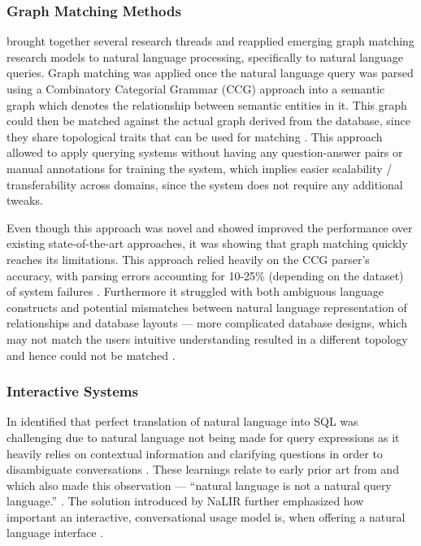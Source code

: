 \documentclass{article}
\begin{document}
\subsubsection{Graph Matching Methods}

\cite{GraphMatching} brought together several research threads and reapplied emerging graph matching research models
to natural language processing, specifically to natural language queries. Graph matching was applied once the natural 
language query was parsed using a Combinatory Categorial Grammar (CCG) approach into a semantic graph which denotes the 
relationship between semantic entities in it. This graph could then be matched against the actual graph derived from 
the database, since they share topological traits that can be used for matching \citep{GraphMatching}. This approach 
allowed to apply querying systems without having any question-answer pairs or manual annotations for training the system, 
which implies easier scalability / transferability across domains, since the system does not require any additional 
tweaks.

Even though this approach was novel and showed improved the performance over existing state-of-the-art approaches, it
was showing that graph matching quickly reaches its limitations. This approach relied heavily on the CCG parser's 
accuracy, with parsing errors accounting for 10-25\% (depending on the dataset) of system failures \citep{GraphMatching}. 
Furthermore it struggled with both ambiguous language constructs and potential mismatches between natural language 
representation of relationships and database layouts — more complicated database designs, which may not match the users 
intuitive understanding resulted in a different topology and hence could not be matched \citep[p.~387]{GraphMatching}.

\subsubsection{Interactive Systems}

In \citeyear{NALIR} \citeauthor*{NALIR} identified that perfect translation of natural language into SQL was challenging
due to natural language not being made for query expressions as it heavily relies on contextual information and clarifying
questions in order to disambiguate conversations \citep{NALIR}. These learnings relate to early prior art from 
\citeauthor{UnnaturalQueryLanguage} and \citeauthor{Rendezvous} which also made this observation — ``natural language
is not a natural query language.'' \citep{UnnaturalQueryLanguage}. The solution introduced by NaLIR further emphasized
how important an interactive, conversational usage model is, when offering a natural language interface \citep{NALIR}.
\end{document}
